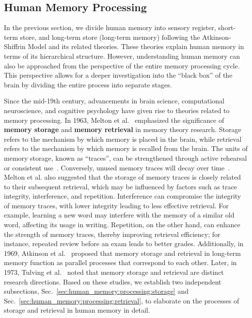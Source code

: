 \documentclass[journal,hideappendix]{vgtc}
\begin{document}
\subsection{Human Memory Processing}
\label{sec:human_memory:processing}

In the previous section, we divide human memory into sensory register, short-term store, and long-term store (long-term memory) following the Atkinson-Shiffrin Model and its related theories. These theories explain human memory in terms of its hierarchical structure. 
However, understanding human memory can also be approached from the perspective of the entire memory processing cycle. This perspective allows for a deeper investigation into the ``black box'' of the brain by dividing the entire process into separate stages.

Since the mid-19th century, advancements in brain science, computational neuroscience, and cognitive psychology have given rise to theories related to memory processing. 
In 1963, Melton et al.~\cite{melton1963implications} emphasized the significance of \textbf{memory storage} and \textbf{memory retrieval} in memory theory research. Storage refers to the mechanism by which memory is placed in the brain, while retrieval refers to the mechanism by which memory is recalled from the brain. The units of memory storage, known as ``traces'', can be strengthened through active rehearsal or consistent use~\cite{muller1900experimentelle}. Conversely, unused memory traces will decay over time~\cite{thorndike1913educational}. Melton et al. also suggested that the storage of memory traces is closely related to their subsequent retrieval, which may be influenced by factors such as trace integrity, interference, and repetition. 
Interference can compromise the integrity of memory traces, with lower integrity leading to less effective retrieval. For example, learning a new word may interfere with the memory of a similar old word, affecting its usage in writing. 
Repetition, on the other hand, can enhance the strength of memory traces, thereby improving retrieval efficiency; for instance, repeated review before an exam leads to better grades. Additionally, in 1969, Atkinson et al.~\cite{shiffrin1969memory} proposed that memory storage and retrieval in long-term memory function as parallel processes that correspond to each other. Later, in 1973, Tulving et al.~\cite{tulving1973encoding} noted that memory storage and retrieval are distinct research directions.
Based on these studies, we establish two independent subsections, Sec.~\ref{sec:human_memory:processing:storage} and Sec.~\ref{sec:human_memory:processing:retrieval}, to elaborate on the processes of storage and retrieval in human memory in detail.
\end{document}
